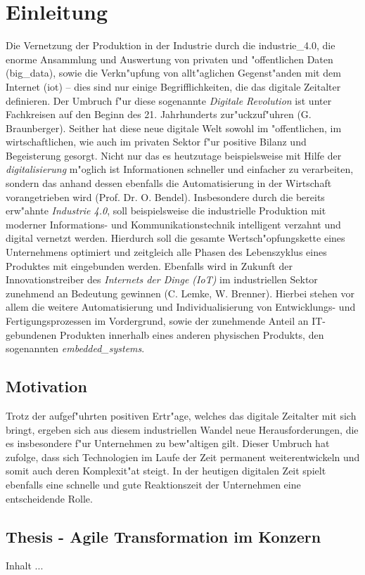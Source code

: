 
\chapter{Einleitung}
\minitoc
\vspace{1 cm} 

Die Vernetzung der Produktion in der Industrie durch die \gls{industrie_4.0}, die enorme 
Ansammlung und Auswertung von privaten und "offentlichen Daten (\gls{big_data}), sowie die 
Verkn"upfung von allt"aglichen Gegenst"anden mit dem Internet (\gls{iot}) -- dies sind nur
einige Begrifflichkeiten, die das digitale Zeitalter definieren. Der Umbruch f"ur diese 
sogenannte \textit{Digitale Revolution} ist unter Fachkreisen auf den Beginn des 21. 
Jahrhunderts zur"uckzuf"uhren \cite{qeins} (G. Braunberger). Seither hat diese neue digitale 
Welt sowohl im "offentlichen, im wirtschaftlichen, wie auch im privaten Sektor f"ur positive Bilanz 
und Begeisterung gesorgt. Nicht nur das es heutzutage beispielsweise mit Hilfe der 
\textit{\gls{digitalisierung}} m"oglich ist Informationen schneller und einfacher zu verarbeiten, 
sondern das anhand dessen ebenfalls die Automatisierung in der Wirtschaft vorangetrieben 
wird \cite{qzwei} (Prof. Dr. O. Bendel). Insbesondere durch die bereits erw"ahnte \textit{Industrie 4.0}, soll beispielsweise die industrielle Produktion mit moderner Informations- und Kommunikationstechnik intelligent verzahnt und digital vernetzt werden. Hierdurch soll die gesamte Wertsch"opfungskette eines Unternehmens optimiert und zeitgleich alle Phasen des Lebenszyklus eines Produktes mit eingebunden werden. Ebenfalls wird in Zukunft der Innovationstreiber des \textit{Internets der Dinge (IoT)} im industriellen Sektor zunehmend an Bedeutung gewinnen \cite{qdrei} (C. Lemke, W. Brenner). Hierbei stehen vor allem die weitere Automatisierung und Individualisierung von Entwicklungs- und Fertigungsprozessen im Vordergrund, sowie der zunehmende Anteil an IT-gebundenen Produkten innerhalb eines anderen physischen Produkts, den sogenannten \textit{\gls{embedded_systems}}.


\section{Motivation}
Trotz der aufgef"uhrten positiven Ertr"age, welches das digitale Zeitalter mit sich bringt, ergeben sich aus diesem industriellen Wandel neue Herausforderungen, die es insbesondere f"ur Unternehmen zu bew"altigen gilt. Dieser Umbruch hat zufolge, dass sich Technologien im Laufe der Zeit permanent weiterentwickeln und somit auch deren Komplexit"at steigt. In der heutigen digitalen Zeit spielt ebenfalls eine schnelle und gute Reaktionszeit der Unternehmen 
eine entscheidende Rolle. 

\section{Thesis - Agile Transformation im Konzern}
Inhalt ...



